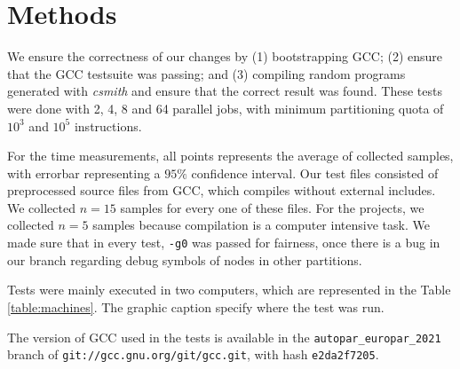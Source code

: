 \documentclass[runningheads]{llncs}
\begin{document}
\section{Methods}\label{sec:methods}

We ensure the correctness of our changes by (1) bootstrapping GCC; (2) ensure
that the GCC testsuite was passing; and (3) compiling random programs generated
with \textit{csmith} \cite{csmith} and ensure that the correct result was
found. These tests were done with 2, 4, 8 and 64 parallel jobs, with minimum
partitioning quota of $10^3$ and $10^5$ instructions.

For the time measurements, all points represents the average of collected
samples, with errorbar representing a $95\%$ confidence interval.
Our test files consisted of preprocessed source files from GCC, which compiles
without external includes. We collected $n = 15$ samples for every one of these
files. For the projects, we collected $n = 5$ samples because compilation is a
computer intensive task. We made sure that in every test, \texttt{-g0} was passed
for fairness, once there is a bug in our branch regarding debug symbols of
nodes in other partitions.

Tests were mainly executed in two computers, which are represented
in the Table \ref{table:machines}. The graphic caption specify where the test
was run.

The version of GCC used in the tests is available in the \texttt{autopar\_europar\_2021}
branch of \texttt{git://gcc.gnu.org/git/gcc.git}, with hash \texttt{e2da2f7205}.

%
%
\end{document}
